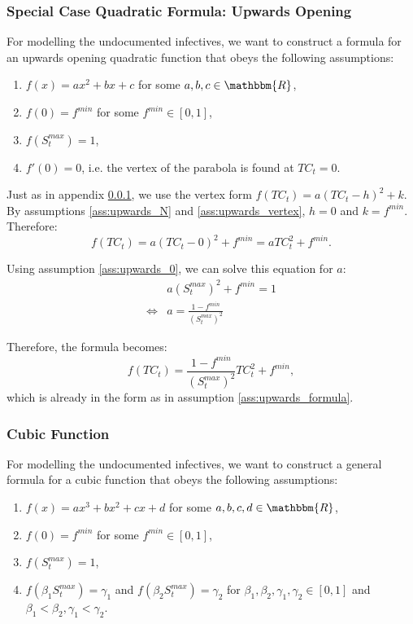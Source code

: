 \documentclass[12pt]{article}
\newcommand{\R}{\mathbbm{R}}
\begin{document}
\begin{appendices}
		\subsubsection{Special Case Quadratic Formula: Upwards Opening} \label{ssapp:upwards_derivation_vertex}
		For modelling the undocumented infectives, we want to construct a formula for an upwards opening quadratic function that obeys the following assumptions:
		\begin{enumerate}[label=(\Roman*)]
		    \item\label{ass:upwards_formula} $f(x) = ax^2 + bx + c$  for some $a, b, c \in \R$,
		    \item\label{ass:upwards_0} $f(0) = f^{min}$ for some $f^{min} \in [0,1]$,
		    \item\label{ass:upwards_N} $f(S^{max}_t) = 1$,
		    \item\label{ass:upwards_vertex} $f'(0) = 0$, i.e. the vertex of the parabola is found at $TC_t = 0$.
		\end{enumerate}
		
		Just as in appendix \ref{ssapp:upwards_derivation_vertex}, we use the vertex form $f(TC_t) = a(TC_t - h)^2 + k$. By assumptions \ref{ass:upwards_N} and \ref{ass:upwards_vertex}, $h=0$ and $k=f^{min}$. Therefore:
		    \[f(TC_t) = a(TC_t - 0)^2 + f^{min} = aTC_t^2 + f^{min}.\]
		    
		\noindent Using assumption \ref{ass:upwards_0}, we can solve this equation for $a$:
		    \begin{align*}
		             & a\left(S^{max}_t\right)^2 + f^{min} = 1\\
		        \iff & a = \frac{1 - f^{min}}{\left(S^{max}_t\right)^2}
		    \end{align*}
		    
		\noindent Therefore, the formula becomes:
		    \[f(TC_t) = \frac{1 - f^{min}}{\left(S^{max}_t\right)^2}TC_t^2 + f^{min},\]
		which is already in the form as in assumption \ref{ass:upwards_formula}.
		
		\subsubsection{Cubic Function} \label{ssapp:cubic_derivation}
		For modelling the undocumented infectives, we want to construct a general formula for a cubic function that obeys the following assumptions:
		\begin{enumerate}[label=(\Roman*)]
		    \item\label{ass:cubic_formula} $f(x) = ax^3 + bx^2 + cx + d$  for some $a, b, c, d \in \R$,
		    \item\label{ass:cubic_0} $f(0) = f^{min}$ for some $f^{min} \in [0,1]$,
		    \item\label{ass:cubic_N} $f(S^{max}_t) = 1$,
		    \item\label{ass:cubic_betaN} $f(\beta_1 S^{max}_t) = \gamma_1$ and $f(\beta_2 S^{max}_t) = \gamma_2$ for $\beta_1, \beta_2, \gamma_1, \gamma_2 \in [0,1]$ and $\beta_1 < \beta_2, \gamma_1 < \gamma_2$.
		\end{enumerate}
		

\end{appendices}
\end{document}
